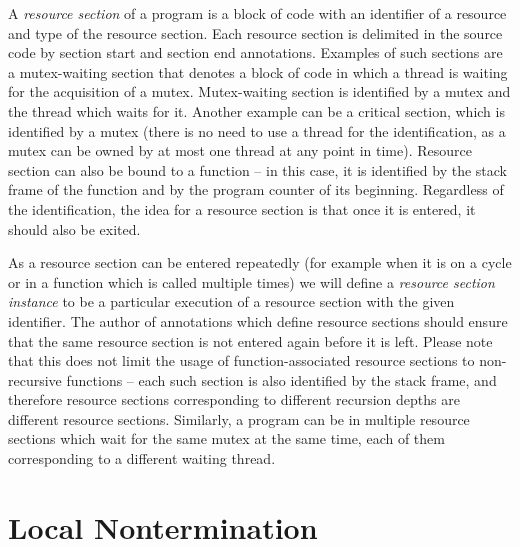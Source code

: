 A \emph{resource section} of a program is a block of code with an identifier of a resource and type of the resource section.
Each resource section is delimited in the source code by section start and section end annotations.
Examples of such sections are a mutex-waiting section that denotes a block of code in which a thread is waiting for the acquisition of a mutex.
Mutex-waiting section is identified by a mutex and the thread which waits for it.
Another example can be a critical section, which is identified by a mutex (there is no need to use a thread for the identification, as a mutex can be owned by at most one thread at any point in time).
Resource section can also be bound to a function -- in this case, it is identified by the stack frame of the function and by the program counter of its beginning.
Regardless of the identification, the idea for a resource section is that once it is entered, it should also be exited.

As a resource section can be entered repeatedly (for example when it is on a cycle or in a function which is called multiple times) we will define a \emph{resource section instance} to be a particular execution of a resource section with the given identifier.
The author of annotations which define resource sections should ensure that the same resource section is not entered again before it is left.
Please note that this does not limit the usage of function-associated resource sections to non-recursive functions -- each such section is also identified by the stack frame, and therefore resource sections corresponding to different recursion depths are different resource sections.
Similarly, a program can be in multiple resource sections which wait for the same mutex at the same time, each of them corresponding to a different waiting thread.

\section{Local Nontermination} \label{sec:local-nontermination}

